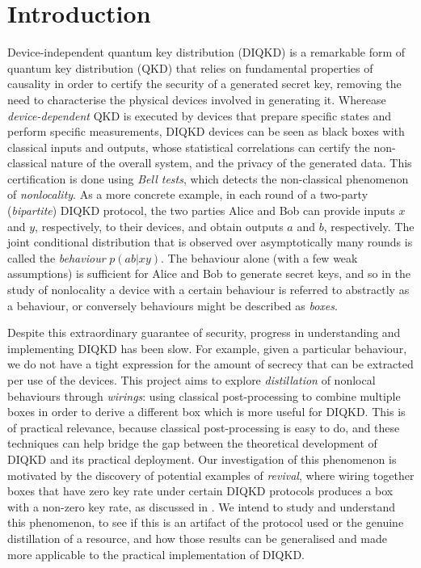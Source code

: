 \documentclass[10pt, a4paper]{article}
\numberwithin{equation}{section} %
\theoremstyle{definition}
\theoremstyle{plain}
\newcommand{\?}{\mathrel{?}} %
\begin{document}
    \section{Introduction}

    Device-independent quantum key distribution (DIQKD) is a remarkable form of quantum key distribution (QKD) that relies on fundamental properties of causality in order to certify the security of a generated secret key, removing the need to characterise the physical devices involved in generating it. Wherease \emph{device-dependent} QKD is executed by devices that prepare specific states and perform specific measurements, DIQKD devices can be seen as black boxes with classical inputs and outputs, whose statistical correlations can certify the non-classical nature of the overall system, and the privacy of the generated data. This certification is done using \emph{Bell tests}, which detects the non-classical phenomenon of \emph{nonlocality}. As a more concrete example, in each round of a two-party (\emph{bipartite}) DIQKD protocol, the two parties Alice and Bob can provide inputs \(x\) and \(y\), respectively, to their devices, and obtain outputs \(a\) and \(b\), respectively. The joint conditional distribution that is observed over asymptotically many rounds is called the \emph{behaviour} \(p(ab|xy)\). The behaviour alone (with a few weak assumptions) is sufficient for Alice and Bob to generate secret keys, and so in the study of nonlocality a device with a certain behaviour is referred to abstractly as a behaviour, or conversely behaviours might be described as \emph{boxes}.

    Despite this extraordinary guarantee of security, progress in understanding and implementing DIQKD has been slow. For example, given a particular behaviour, we do not have a tight expression for the amount of secrecy that can be extracted per use of the devices. This project aims to explore \emph{distillation} of nonlocal behaviours through \emph{wirings}: using classical post-processing to combine multiple boxes in order to derive a different box which is more useful for DIQKD\@. This is of practical relevance, because classical post-processing is easy to do, and these techniques can help bridge the gap between the theoretical development of DIQKD and its practical deployment. Our investigation of this phenomenon is motivated by the discovery of potential examples of \emph{revival}, where wiring together boxes that have zero key rate under certain DIQKD protocols produces a box with a non-zero key rate, as discussed in . We intend to study and understand this phenomenon, to see if this is an artifact of the protocol used or the genuine distillation of a resource, and how those results can be generalised and made more applicable to the practical implementation of DIQKD.
\end{document}
